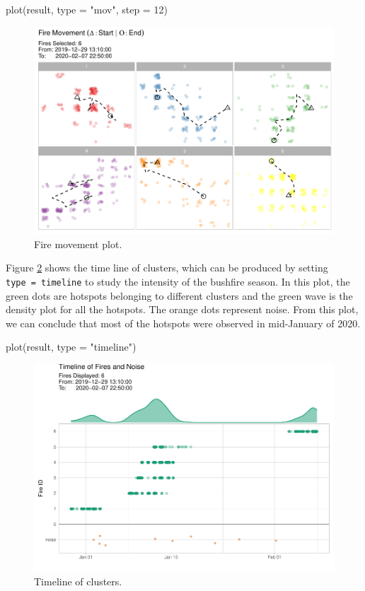 \begin{Schunk}
\begin{Sinput}
plot(result, type = "mov", step = 12)
\end{Sinput}
\begin{figure}

{\centering \includegraphics[width=0.8\linewidth]{clustering_paper_files/figure-latex/demomovplot-1} 

}

\caption[Fire movement plot]{Fire movement plot.}\label{fig:demomovplot}
\end{figure}
\end{Schunk}

Figure \ref{fig:demotimeline} shows the time line of clusters, which can
be produced by setting
\texttt{type\ =\ \textquotesingle{}timeline\textquotesingle{}} to study
the intensity of the bushfire season. In this plot, the green dots are
hotspots belonging to different clusters and the green wave is the
density plot for all the hotspots. The orange dots represent noise. From
this plot, we can conclude that most of the hotspots were observed in
mid-January of 2020.

\begin{Schunk}
\begin{Sinput}
plot(result, type = "timeline")
\end{Sinput}
\begin{figure}

{\centering \includegraphics[width=0.8\linewidth]{clustering_paper_files/figure-latex/demotimeline-1} 

}

\caption[Timeline of clusters]{Timeline of clusters.}\label{fig:demotimeline}
\end{figure}
\end{Schunk}

